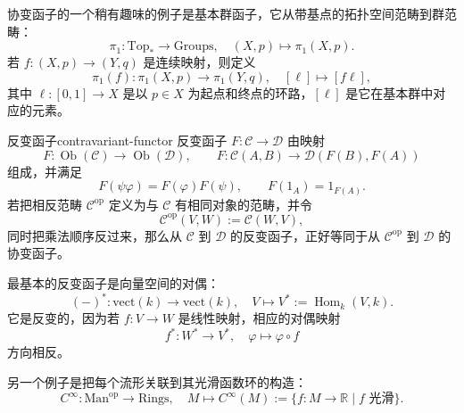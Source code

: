 \begin{example}[基本群函子]\label{ex:pi1-functor}
协变函子的一个稍有趣味的例子是基本群函子，它从带基点的拓扑空间范畴到群范畴：
\[
  \pi_1\colon\mathrm{Top}_*\to\mathrm{Groups},\quad
  (X,p)\longmapsto\pi_1(X,p).
\]
若 $f\colon(X,p)\to(Y,q)$ 是连续映射，则定义
\[
  \pi_1(f)\colon\pi_1(X,p)\to\pi_1(Y,q),\quad
  [\ell]\longmapsto[f\ell],
\]
其中 $\ell\colon[0,1]\to X$ 是以 $p\in X$ 为起点和终点的环路，$[\ell]$ 是它在基本群中对应的元素。
\end{example}

\begin{definition}{反变函子}{contravariant-functor}
反变函子 $F\colon\mathcal C\to\mathcal D$ 由映射
\[
F\colon\operatorname{Ob}(\mathcal C)\to\operatorname{Ob}(\mathcal D),
\qquad
F\colon\mathcal C(A,B)\to\mathcal D(F(B),F(A))
\]
组成，并满足
\[
F(\psi\varphi)=F(\varphi)F(\psi),\qquad F(1_A)=1_{F(A)}.
\]
若把相反范畴 $\mathcal C^{\mathrm{op}}$ 定义为与 $\mathcal C$ 有相同对象的范畴，并令
\[
\mathcal C^{\mathrm{op}}(V,W):=\mathcal C(W,V),
\]
同时把乘法顺序反过来，那么从 $\mathcal C$ 到 $\mathcal D$ 的反变函子，正好等同于从 $\mathcal C^{\mathrm{op}}$ 到 $\mathcal D$ 的协变函子。
\end{definition}

\begin{example}[向量空间的对偶]\label{ex:dual-functor}
最基本的反变函子是向量空间的对偶：
\[
  (-)^*\colon\mathrm{vect}(k)\to\mathrm{vect}(k),\quad
  V\longmapsto V^*:=\operatorname{Hom}_k(V,k).
\]
它是反变的，因为若 $f\colon V\to W$ 是线性映射，相应的对偶映射
\[
  f^*\colon W^*\to V^*,\quad \varphi\longmapsto\varphi\circ f
\]
方向相反。
\end{example}

\begin{example}[光滑函数函子]\label{ex:smooth-functions}
另一个例子是把每个流形关联到其光滑函数环的构造：
\[
 C^\infty\colon\mathrm{Man}^{\mathrm{op}}\to\mathrm{Rings},\quad
 M\longmapsto C^\infty(M):=\{f\colon M\to\mathbb R\mid f\text{ 光滑}\}.
\]
\end{example}

